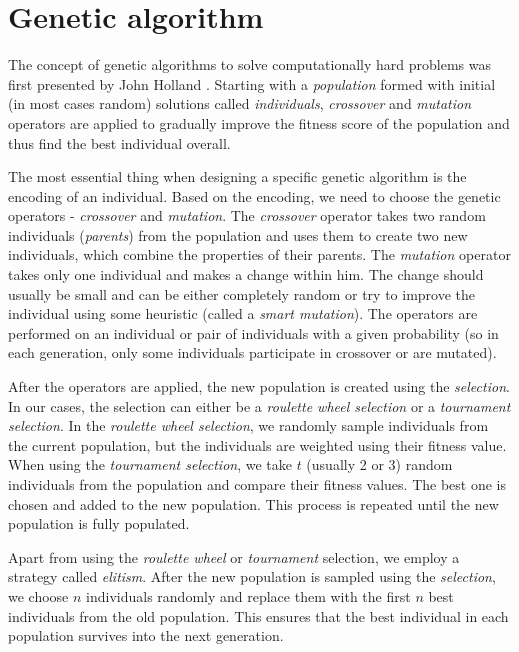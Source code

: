 \chapter{Genetic algorithm}\label{ch:genetic}

The concept of genetic algorithms to solve computationally hard problems was first presented by John Holland \cite{Holland:1992}. Starting with a \textit{population} formed with initial (in most cases random) solutions called \textit{individuals}, \textit{crossover} and \textit{mutation} operators are applied to gradually improve the fitness score of the population and thus find the best individual overall.

The most essential thing when designing a specific genetic algorithm is the encoding of an individual. Based on the encoding, we need to choose the genetic operators - \textit{crossover} and \textit{mutation}. The \textit{crossover} operator takes two random individuals (\textit{parents}) from the population and uses them to create two new individuals, which combine the properties of their parents. The \textit{mutation} operator takes only one individual and makes a change within him. The change should usually be small and can be either completely random or try to improve the individual using some heuristic (called a \textit{smart mutation}). The operators are performed on an individual or pair of individuals with a given probability (so in each generation, only some individuals participate in crossover or are mutated).

After the operators are applied, the new population is created using the \textit{selection}. In our cases, the selection can either be a \textit{roulette wheel selection} or a \textit{tournament selection}. In the \textit{roulette wheel selection}, we randomly sample individuals from the current population, but the individuals are weighted using their fitness value. When using the \textit{tournament selection}, we take $t$ (usually 2 or 3) random individuals from the population and compare their fitness values. The best one is chosen and added to the new population. This process is repeated until the new population is fully populated.

Apart from using the \textit{roulette wheel} or \textit{tournament} selection, we employ a strategy called \textit{elitism}. After the new population is sampled using the \textit{selection}, we choose $n$ individuals randomly and replace them with the first $n$ best individuals from the old population. This ensures that the best individual in each population survives into the next generation.

